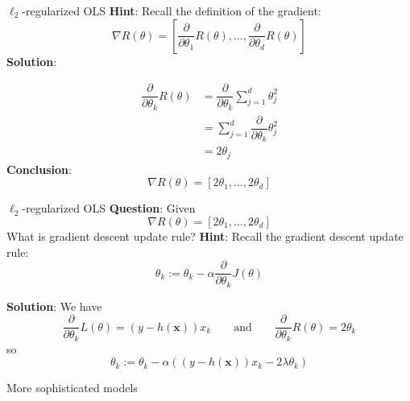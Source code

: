 \documentclass{beamer}
\newcommand{\1}[1]{\mathbbm{1}\left[#1\right]}
\newcommand{\bx}{\bm{x}}
\begin{document}
\begin{frame}{$\ell_2$-regularized OLS}
\textbf{Hint}: Recall the definition of the gradient:
\begin{equation*}
\nabla R(\theta) = \left[ \dfrac{\partial}{\partial \theta_1} R(\theta), \dots, \dfrac{\partial}{\partial \theta_d} R(\theta) \right]
\end{equation*}
\vfill
\pause
\textbf{Solution}: 

\begin{equation*}
\begin{split}
\dfrac{\partial}{\partial \theta_k} R(\theta) &= \dfrac{\partial}{\partial \theta_k} \sum_{j = 1}^d \theta_j^2 \\
&= \sum_{j = 1}^d \dfrac{\partial}{\partial \theta_k} \theta_j^2 \\
&= 2 \theta_j
\end{split}
\end{equation*}
\textbf{Conclusion}:
\begin{equation*}
\nabla R(\theta) = \left[ 2\theta_1, \dots, 2\theta_d \right]
\end{equation*}
\end{frame}

\begin{frame}{$\ell_2$-regularized OLS}
\textbf{Question}: Given
\begin{equation*}
\nabla R(\theta) = \left[ 2\theta_1, \dots, 2\theta_d \right]
\end{equation*}
What is gradient descent update rule?
\pause
\vfill
\textbf{Hint}: Recall the gradient descent update rule:
\begin{equation*}
\theta_k := \theta_k - \alpha \dfrac{\partial}{\partial \theta_k} J(\theta)
\end{equation*}

\textbf{Solution}: We have 
\begin{equation*}
\dfrac{\partial}{\partial \theta_k} L(\theta) = \left( y - h\left(\bx\right)\right) x_k \qquad \text{and} \qquad
\dfrac{\partial}{\partial \theta_k} R(\theta) = 2\theta_k
\end{equation*}
so
\begin{equation*}
\theta_k := \theta_k - \alpha (\left( y - h\left(\bx\right)\right) x_k - 2 \lambda \theta_k)
\end{equation*}
\end{frame}

\begin{frame}
	\center
	\huge{More sophisticated models}
\end{frame}
\end{document}
